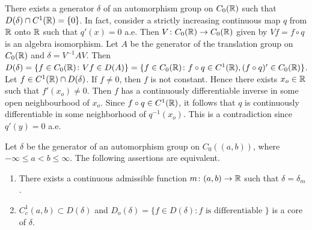 \begin{example}\label{ex:b2-3.22}
There exists a generator $\delta$ of an automorphism group on $C_{0}(\mathbb{R})$ such that $D(\delta) \cap C^{1}(\mathbb{R}) = \{0\}$.
In fact, consider a strictly increasing continuous map $q$ from $\mathbb{R}$ onto $\mathbb{R}$ such that
$q'(x) = 0$ a.e.
Then $V \colon C_{0}(\mathbb{R}) \to C_{0}(\mathbb{R})$ given by $Vf = f \circ q$ is an algebra isomorphism.
Let $A$ be the generator of the translation group on $C_{0}(\mathbb{R})$ and $\delta = V^{-1}AV$.
Then $D(\delta) = \{ f \in C_{0}(\mathbb{R}) \colon Vf \in D(A)\} = \{f \in C_{0}(\mathbb{R}) \colon f \circ q \in C^{1}(\mathbb{R}), (f \circ q)' \in C_{0}(\mathbb{R}) \}$.
Let $f \in C^{1}(\mathbb{R}) \cap D(\delta)$.
If $f \neq 0$, then $f$ is not constant.
Hence there exists $x_{o} \in \mathbb{R}$ such that $f'(x_{o}) \neq 0$.
Then $f$ has a continuously differentiable inverse in some open neighbourhood of $x_{o}$.
Since $f \circ q \in C^{1}(\mathbb{R})$, it follows that $q$ is continuously differentiable in some neighborhood of $q^{-1}(x_{o})$.
This is a contradiction since $q'(y) = 0$ a.e.
\end{example}
\begin{theorem}\label{thm:b2-3.23}
Let $\delta$ be the generator of an automorphism group on $C_{0}((a,b))$, where $-\infty \leq a < b \leq \infty$.
The following assertions are equivalent.
\begin{enumerate}[\upshape (a)]
\item \label{thm:b2-3.23-1} 
There exists a continuous admissible function $m \colon (a,b) \to \mathbb{R}$ such that $\delta = \delta_{m}$.
\item \label{thm:b2-3.23-2}
$C_{c}^{1}(a,b) \subset D(\delta)$ and $D_{o}(\delta) = \{ f \in D(\delta) \colon f \text{ is differentiable } \}$ is a core of $\delta$.
\end{enumerate}
\end{theorem}
